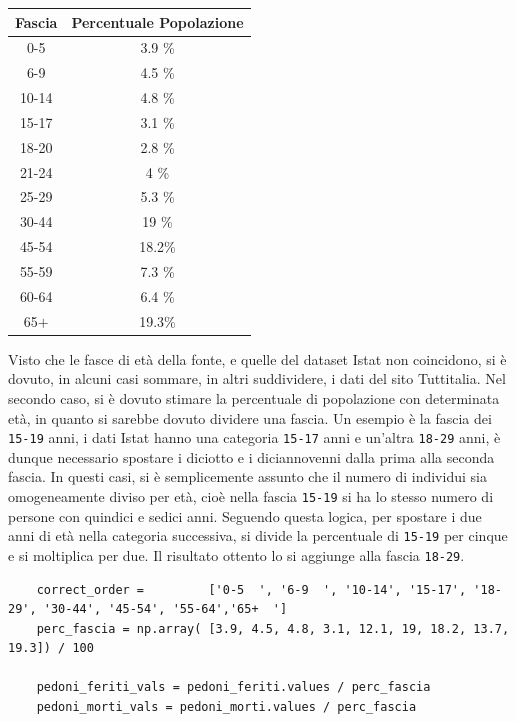\documentclass[a4paper,12pt]{report}
\newcommand{\columnstyle}[1]{\texttt{#1}}
\begin{document}
\begin{center}
    \def\arraystretch{1.5}%
    \begin{tabular}{ |c|c| } 
    \hline
    Fascia & Percentuale Popolazione \\ 
    \hline
    \rowcolor{TableGray}
    0-5     & 3.9 \% \\ 
    6-9     & 4.5 \% \\
    \rowcolor{TableGray}
    10-14   & 4.8 \% \\
    15-17   & 3.1 \% \\
    \rowcolor{TableGray}
    18-20   & 2.8 \% \\ 
    21-24   & 4   \% \\
    \rowcolor{TableGray}
    25-29   & 5.3 \% \\
    30-44   & 19  \% \\
    \rowcolor{TableGray}
    45-54   & 18.2\% \\ 
    55-59   & 7.3 \% \\
    \rowcolor{TableGray}
    60-64   & 6.4 \% \\
    65$+$   & 19.3\% \\
    \hline
    \end{tabular}
\end{center}
Visto che le fasce di età della fonte, e quelle del dataset Istat non coincidono, 
si è dovuto, in alcuni casi sommare, in altri suddividere, i dati del sito Tuttitalia.
Nel secondo caso, si è dovuto stimare la percentuale di popolazione con 
determinata età, in quanto si sarebbe dovuto dividere una fascia.
Un esempio è la fascia dei \columnstyle{15-19} anni, 
i dati Istat hanno una categoria \columnstyle{15-17} anni e un'altra 
\columnstyle{18-29} anni, 
è dunque necessario spostare i diciotto e i diciannovenni dalla prima alla 
seconda fascia. 
In questi casi, si è semplicemente assunto che il numero di individui sia omogeneamente 
diviso per età, cioè nella fascia \columnstyle{15-19} si ha lo stesso numero di 
persone con quindici e sedici anni.
Seguendo questa logica, per spostare i due anni di età nella categoria successiva, 
si divide la percentuale di \columnstyle{15-19} per cinque e si moltiplica per due. 
Il risultato ottento lo si aggiunge alla fascia \columnstyle{18-29}.

\begin{lstlisting}
    correct_order =         ['0-5  ', '6-9  ', '10-14', '15-17', '18-29', '30-44', '45-54', '55-64','65+  ']
    perc_fascia = np.array( [3.9, 4.5, 4.8, 3.1, 12.1, 19, 18.2, 13.7, 19.3]) / 100

    pedoni_feriti_vals = pedoni_feriti.values / perc_fascia
    pedoni_morti_vals = pedoni_morti.values / perc_fascia
\end{lstlisting}
\end{document}
